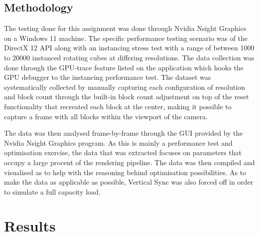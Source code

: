 \documentclass{article}
\begin{document}
\subsection{Methodology}

The testing done for this assignment was done through Nvidia Nsight Graphics on a Windows 11 machine. The specific performance testing scenario was of the DirectX 12 API along with
an instancing stress test with a range of between 1000 to 20000 instanced rotating cubes at differing resolutions. The data collection was done through the GPU-trace feature listed
on the application which hooks the GPU debugger to the instancing performance test. The dataset was systematically collected by manually capturing each configuration of resolution
and block count through the built-in block count adjustment on top of the reset functionality that recreated each block at the center, making it possible to capture a frame with
all blocks within the viewport of the camera.

The data was then analysed frame-by-frame through the GUI provided by the Nvidia Nsight Graphics program. As this is mainly a performance test and optimisation exercise, the data that
was extracted focuses on parameters that occupy a large procent of the rendering pipeline. The data was then compiled and visualised as to help with the reasoning behind optimisation
possibilities. As to make the data as applicable as possible, Vertical Sync was also forced off in order to simulate a full capacity load.

\section{Results}
\end{document}

